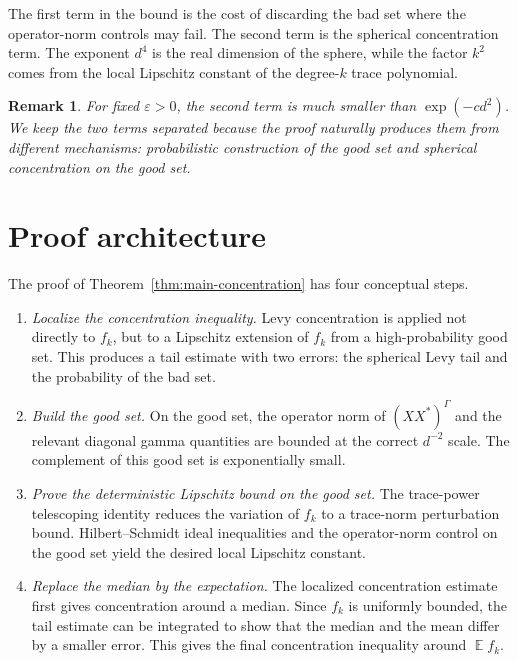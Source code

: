\documentclass[11pt,reqno]{amsart}
\newtheorem{remark}[theorem]{Remark}
\DeclareMathOperator{\E}{\mathbb{E}}
\newenvironment{revderived}{\begingroup\color{RevisionDerived}}{\endgroup}
\begin{document}
\begin{revderived}
The first term in the bound is the cost of discarding the bad set where the
operator-norm controls may fail.  The second term is the spherical
concentration term.  The exponent \(d^4\) is the real dimension of the sphere,
while the factor \(k^2\) comes from the local Lipschitz constant of the
degree-\(k\) trace polynomial.

\begin{remark}
For fixed \(\varepsilon>0\), the second term is much smaller than
\(\exp(-c d^2)\).  We keep the two terms separated because the proof naturally
produces them from different mechanisms: probabilistic construction of the
good set and spherical concentration on the good set.
\end{remark}

\section{Proof architecture}

The proof of Theorem~\ref{thm:main-concentration} has four conceptual steps.

\begin{enumerate}[leftmargin=*]
\item \emph{Localize the concentration inequality.}
  Levy concentration is applied not directly to \(f_k\), but to a Lipschitz
  extension of \(f_k\) from a high-probability good set.  This produces a tail
  estimate with two errors: the spherical Levy tail and the probability of the
  bad set.

\item \emph{Build the good set.}
  On the good set, the operator norm of \((XX^*)^\Gamma\) and the relevant
  diagonal gamma quantities are bounded at the correct \(d^{-2}\) scale.  The
  complement of this good set is exponentially small.

\item \emph{Prove the deterministic Lipschitz bound on the good set.}
  The trace-power telescoping identity reduces the variation of \(f_k\) to a
  trace-norm perturbation bound.  Hilbert--Schmidt ideal inequalities and the
  operator-norm control on the good set yield the desired local Lipschitz
  constant.

\item \emph{Replace the median by the expectation.}
  The localized concentration estimate first gives concentration around a
  median.  Since \(f_k\) is uniformly bounded, the tail estimate can be
  integrated to show that the median and the mean differ by a smaller error.
  This gives the final concentration inequality around \(\E f_k\).
\end{enumerate}


\end{revderived}
\end{document}
